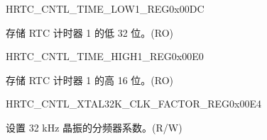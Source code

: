 \begin{register}{H}{RTC\_CNTL\_TIME\_LOW1\_REG}{0x00DC}\label{regdesc:RTCCNTLTIMELOW1REG}
%
\regnewline%
\begin{regdesc}\begin{reglist}
\label{fielddesc:RTCCNTLTIMERVALUE1LOW}\item [RTC\_CNTL\_TIMER\_VALUE1\_LOW] 存储 RTC 计时器 1 的低 32 位。(RO)
\end{reglist}\end{regdesc}
\end{register}


\begin{register}{H}{RTC\_CNTL\_TIME\_HIGH1\_REG}{0x00E0}\label{regdesc:RTCCNTLTIMEHIGH1REG}
%
%
\regnewline%
\begin{regdesc}\begin{reglist}
\label{fielddesc:RTCCNTLTIMERVALUE1HIGH}\item [RTC\_CNTL\_TIMER\_VALUE1\_HIGH] 存储 RTC 计时器 1 的高 16 位。(RO)
\end{reglist}\end{regdesc}
\end{register}


\begin{register}{H}{RTC\_CNTL\_XTAL32K\_CLK\_FACTOR\_REG}{0x00E4}\label{regdesc:RTCCNTLXTAL32KCLKFACTORREG}
%
\regnewline%
\begin{regdesc}\begin{reglist}
\label{fielddesc:RTCCNTLXTAL32KCLKFACTOR}\item [RTC\_CNTL\_XTAL32K\_CLK\_FACTOR] 设置 32 kHz 晶振的分频器系数。(R/W)
\end{reglist}\end{regdesc}
\end{register}


